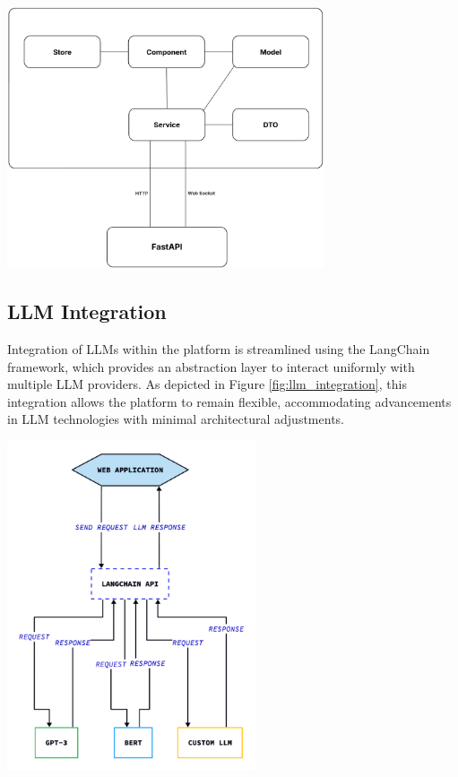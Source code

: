 \vspace{0.3cm}

\begin{center}
    \includegraphics[width=0.7\textwidth]{Images/Component Architecture of a Frontend Module.png}
    \label{fig:frontend_module_architecture}
\end{center}

\subsection{LLM Integration}
Integration of LLMs within the platform is streamlined using the LangChain framework, which provides an abstraction layer to interact uniformly with multiple LLM providers. As depicted in Figure \ref{fig:llm_integration}, this integration allows the platform to remain flexible, accommodating advancements in LLM technologies with minimal architectural adjustments.\mynewline

\begin{center}
    \centering
    \includegraphics[width=0.55\textwidth]{Images/LLM Integration.png}
    \label{fig:llm_integration}
\end{center}


